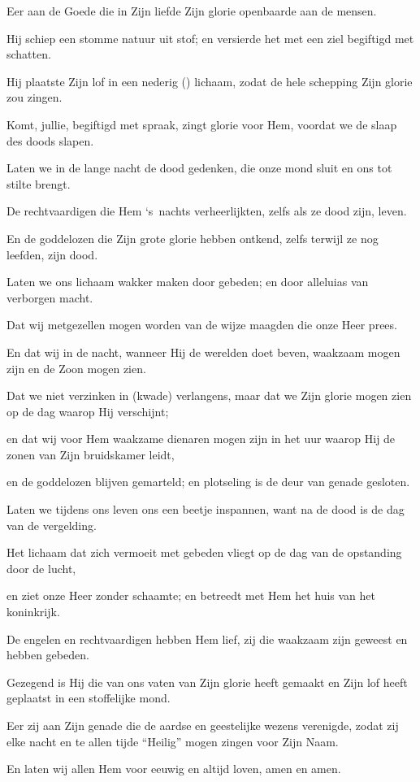 \documentclass[12pt,twoside,a5paper]{article}
\begin{document}
\begin{halfparskip}
  Eer aan de Goede die in Zijn liefde Zijn glorie openbaarde aan de mensen.

  Hij schiep een stomme natuur uit stof; en versierde het met een ziel begiftigd met schatten.

  Hij plaatste Zijn lof in een nederig () lichaam, zodat de hele schepping Zijn glorie zou zingen.

  Komt, jullie, begiftigd met spraak, zingt glorie voor Hem, voordat we de slaap des doods slapen.

  Laten we in de lange nacht de dood gedenken, die onze mond sluit en ons tot stilte brengt.

  De rechtvaardigen die Hem `s~nachts verheerlijkten, zelfs als ze dood zijn, leven.

  En de goddelozen die Zijn grote glorie hebben ontkend, zelfs terwijl ze nog leefden, zijn dood.

  Laten we ons lichaam wakker maken door gebeden; en door alleluias van verborgen macht.

  Dat wij metgezellen mogen worden van de wijze maagden die onze Heer prees.

  En dat wij in de nacht, wanneer Hij de werelden doet beven, waakzaam mogen zijn en de Zoon mogen zien.

  Dat we niet verzinken in (kwade) verlangens, maar dat we Zijn glorie mogen zien op de dag waarop Hij verschijnt;

  en dat wij voor Hem waakzame dienaren mogen zijn in het uur waarop Hij de zonen van Zijn bruidskamer leidt,

  en de goddelozen blijven gemarteld; en plotseling is de deur van genade gesloten.

  Laten we tijdens ons leven ons een beetje inspannen, want na de dood is de dag van de vergelding.

  Het lichaam dat zich vermoeit met gebeden vliegt op de dag van de opstanding door de lucht,

  en ziet onze Heer zonder schaamte; en betreedt met Hem het huis van het koninkrijk.

  De engelen en rechtvaardigen hebben Hem lief, zij die waakzaam zijn geweest en hebben gebeden.

  Gezegend is Hij die van ons vaten van Zijn glorie heeft gemaakt en Zijn lof heeft geplaatst in een stoffelijke mond.

  Eer zij aan Zijn genade die de aardse en geestelijke wezens verenigde, zodat zij elke nacht en te allen tijde ``Heilig'' mogen zingen voor Zijn Naam.

  En laten wij allen Hem voor eeuwig en altijd loven, amen en amen.
\end{halfparskip}
\end{document}
